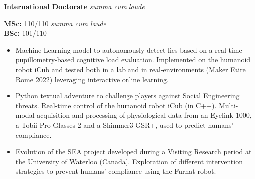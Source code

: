 
\textbf{International Doctorate} \textit{summa cum laude}

\divider

\textbf{MSc:} 110/110 \textit{summa cum laude}\\ 
\textbf{BSc:} 101/110


\begin{itemize}
\item Machine Learning model to autonomously detect lies based on a real-time pupillometry-based cognitive load evaluation. Implemented on the humanoid robot iCub and tested both in a lab and in real-environments (Maker Faire Rome 2022) leveraging interactive online learning.
\end{itemize}
\smallskip


\begin{itemize}
\item Python textual adventure to challenge players against Social Engineering threats. Real-time control of the humanoid robot iCub (in C++). Multi-modal acquisition and processing of physiological data from an Eyelink 1000, a Tobii Pro Glasses 2 and a Shimmer3 GSR+, used to predict humans' compliance.
\end{itemize}
\smallskip

\begin{itemize}
\item Evolution of the SEA project developed during a Visiting Research period at the University of Waterloo (Canada). Exploration of different intervention strategies to prevent humans' compliance using the Furhat robot.
\end{itemize}
\smallskip

